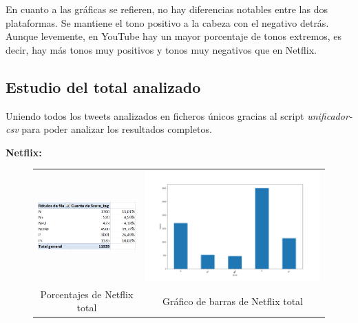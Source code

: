 En cuanto a las gráficas se refieren, no hay diferencias notables entre las dos plataformas. Se mantiene el tono positivo a la cabeza con el negativo detrás. Aunque levemente, en YouTube hay un mayor porcentaje de tonos extremos, es decir, hay más tonos muy positivos y tonos muy negativos que en Netflix. 



\subsection{Estudio del total analizado}
Uniendo todos los tweets analizados en ficheros únicos gracias al script \textit{unificador-csv} para poder analizar los resultados completos.


\textbf{Netflix: }

 \begin{figure}[H]
	\centering
	\begin{tabular}{c c}
		
		\includegraphics[scale=.7]{imagenes/porcentajeNetflixAll-NONE.png}
		&  \includegraphics[scale=.7]{imagenes/barrasNetflixAll.png} \\ 
		
		{Porcentajes de Netflix total}
		
		&  {Gráfico de barras de Netflix total} \\ 
		
	\end{tabular} 
	\label{fig:NetflixAll}
\end{figure}


